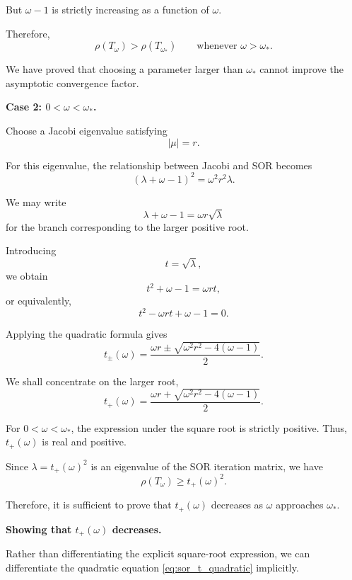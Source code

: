 \documentclass[11pt,a4paper]{article}
\theoremstyle{definition}
\theoremstyle{remark}
\begin{document}
But $\omega-1$ is strictly increasing
as a function of $\omega$.

Therefore,
\[
    \rho(T_\omega)>
    \rho(T_{\omega_*})
    \qquad
    \text{whenever }\omega>\omega_*.
\]

We have proved that choosing a parameter
larger than $\omega_*$ cannot improve
the asymptotic convergence factor.

\medskip
\noindent
\textbf{Case 2: $0<\omega<\omega_*$.}

Choose a Jacobi eigenvalue satisfying
\[
    |\mu|=r.
\]

For this eigenvalue, the relationship
between Jacobi and SOR becomes
\[
    (\lambda+\omega-1)^2
    =
    \omega^2r^2\lambda.
\]

We may write
\[
    \lambda+\omega-1
    =
    \omega r\sqrt{\lambda}
\]
for the branch corresponding to the
larger positive root.

Introducing
\[
    t=\sqrt{\lambda},
\]
we obtain
\[
    t^2+\omega-1=\omega rt,
\]
or equivalently,
\begin{equation}
    \boxed{
    t^2-\omega rt+\omega-1=0.
    }
    \label{eq:sor_t_quadratic}
\end{equation}

Applying the quadratic formula gives
\[
    t_{\pm}(\omega)
    =
    \frac{
        \omega r
        \pm
        \sqrt{\omega^2r^2-4(\omega-1)}
    }{2}.
\]

We shall concentrate on the larger root,
\begin{equation}
    \boxed{
    t_+(\omega)
    =
    \frac{
        \omega r+
        \sqrt{\omega^2r^2-4(\omega-1)}
    }{2}.
    }
    \label{eq:sor_larger_root}
\end{equation}

For $0<\omega<\omega_*$, the expression
under the square root is strictly positive.
Thus, $t_+(\omega)$ is real and positive.

Since $\lambda=t_+(\omega)^2$ is an
eigenvalue of the SOR iteration matrix,
we have
\begin{equation}
    \boxed{
    \rho(T_\omega)\geq t_+(\omega)^2.
    }
    \label{eq:sor_rho_lower_root}
\end{equation}

Therefore, it is sufficient to prove that
$t_+(\omega)$ decreases as $\omega$
approaches $\omega_*$.

\medskip
\noindent
\textbf{Showing that $t_+(\omega)$ decreases.}

Rather than differentiating the explicit
square-root expression, we can differentiate
the quadratic equation
\eqref{eq:sor_t_quadratic} implicitly.
\end{document}
